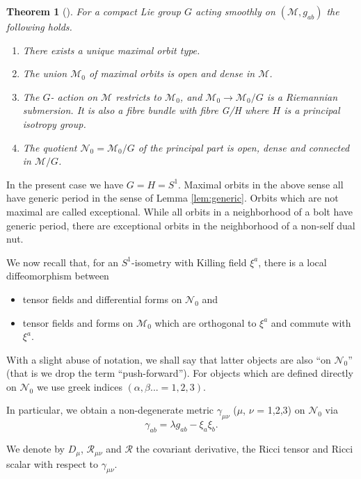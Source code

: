 \documentclass[a4paper,10pt,reqno]{amsart}
\newcommand{\cR}{\mathcal{R}}
\newcommand{\cM}{\mathcal{M}}
\newcommand{\cN}{\mathcal{N}}
\newcommand{\al}{\alpha}
\newcommand{\be}{\beta}
\theoremstyle{plain}
\newtheorem{thm}{Theorem}[section]
\numberwithin{equation}{section}
\begin{document}
\begin{thm}[\cite{MR889050}] \label{thm:quot}
For a compact Lie group $G$ acting smoothly on $(\cM, g_{ab})$ the following holds.  
\begin{enumerate}
\item 
There exists a unique maximal orbit type.
\item 
The union $\cM_0$ of maximal orbits is open and dense in $\cM$.
\item 
The $G$- action on $\cM$ restricts to $\cM_0$, and  $\cM_0 \rightarrow \cM_0 /G $
is a Riemannian submersion. It is also a fibre bundle with fibre G/H where $H$ is a principal isotropy group.
\item 
The quotient $\cN_0= \cM_0 /G$ of the principal part is open, dense and connected in $\cM /G $.
\end{enumerate} 
\end{thm}

In the present case we  have $G = H = S^1$.  
Maximal orbits in the above sense  all have generic period in the sense of Lemma \ref{lem:generic}.  
Orbits which are not maximal are called exceptional.
While all orbits in a neighborhood of a bolt have generic period, there are exceptional orbits in the neighborhood of a non-self dual nut.

We now recall \cite{1971JMP....12..918G} that, for an $S^1$-isometry with Killing field $\xi^a$, there is a local diffeomorphism between 
\begin{itemize} 
\item
tensor fields and differential forms on $\cN_0$ and 
\item 
tensor fields and forms on $\cM_0$ which are orthogonal to $\xi^a$ and  commute with  $\xi^a$.
\end{itemize}
With a slight abuse of notation, we shall say that latter objects are also ``on  $\cN_{0}$'' (that is we drop the term ``push-forward''). For objects which are defined directly  on $\cN_0$ we use greek indices $(\al, \be...= 1,2,3)$. 

In particular, we obtain a non-degenerate metric $\gamma_{\mu\nu}$ ($\mu$, $\nu$ = 1,2,3) on $\cN_0$ via
\begin{equation}
\gamma_{ab} = \lambda g_{ab} - \xi_{a}\xi_{b}.
\label{2Gamma}
\end{equation}

We denote by $D_{\mu}$, $\cR_{\mu\nu}$ and $\cR$ the covariant derivative, the Ricci tensor and Ricci scalar with respect to $\gamma_{\mu\nu}$.
\end{document}
